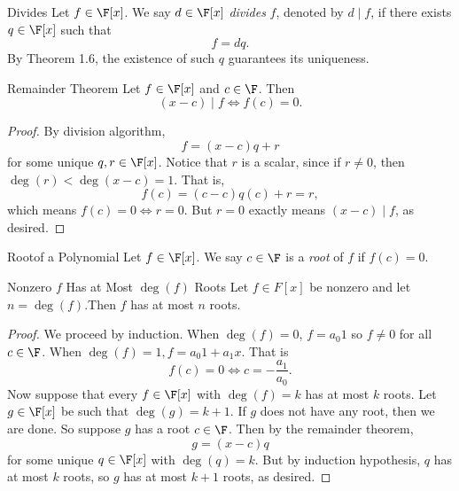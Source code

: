 \documentclass[math_245.tex]{subfiles}
\begin{document}
    \begin{definition}{Divides}{}
        Let $f\in \F[x]$. We say $d\in \F[x]$ \emph{divides} $f$, denoted by $d\mid f$, if there exists $q\in\F[x]$ such that
        \begin{equation*}
            f = dq.
        \end{equation*}
        By Theorem 1.6, the existence of such $q$ guarantees its uniqueness. 
    \end{definition}

    \begin{cor}{Remainder Theorem}
        Let $f\in \F[x]$ and $c\in \F$. Then
        \begin{equation*}
            (x-c)\mid f \iff f(c) = 0.
        \end{equation*}
    \end{cor}

    \begin{proof}
        By division algorithm,
        \begin{equation*}
            f = (x-c)q + r
        \end{equation*}
        for some unique $q,r\in \F[x]$. Notice that $r$ is a scalar, since if $r\neq 0$, then $\deg(r)< \deg(x-c) = 1$. That is,
        \begin{equation*}
            f(c) = (c-c)q(c)+r = r,
        \end{equation*}
        which means $f(c) = 0 \iff r = 0$. But $r=0$ exactly means $(x-c)\mid f$, as desired.
    \end{proof}

    \begin{definition}{Root}{of a Polynomial}
        Let $f\in \F[x]$. We say $c\in \F$ is a \emph{root} of $f$ if $f(c) = 0$.
    \end{definition}

    \clearpage

    \begin{cor}{Nonzero $f$ Has at Most $\deg(f)$ Roots}
        Let $f\in F[x]$ be nonzero and let $n=\deg(f)$.Then $f$ has at most $n$ roots.
    \end{cor}

    \begin{proof}
        We proceed by induction. When $\deg(f) = 0$, $f = a_0 1$ so $f\neq 0$ for all $c\in \F$. When $\deg(f) = 1, f = a_0 1+a_1x$. That is
        \begin{equation*}
            f(c) = 0 \iff c = -\frac{a_1}{a_0}.
        \end{equation*}
        Now suppose that every $f\in \F[x]$ with $\deg(f) = k$ has at most $k$ roots. Let $g\in \F[x]$ be such that $\deg(g) = k+1$. If $g$ does not have any root, then we are done. So suppose $g$ has a root $c\in \F$. Then by the remainder theorem,
        \begin{equation*}
            g = (x-c)q
        \end{equation*}
        for some unique $q\in \F[x]$ with $\deg(q) = k$. But by induction hypothesis, $q$ has at most $k$ roots, so $g$ has at most $k+1$ roots, as desired.
    \end{proof}
\end{document}
